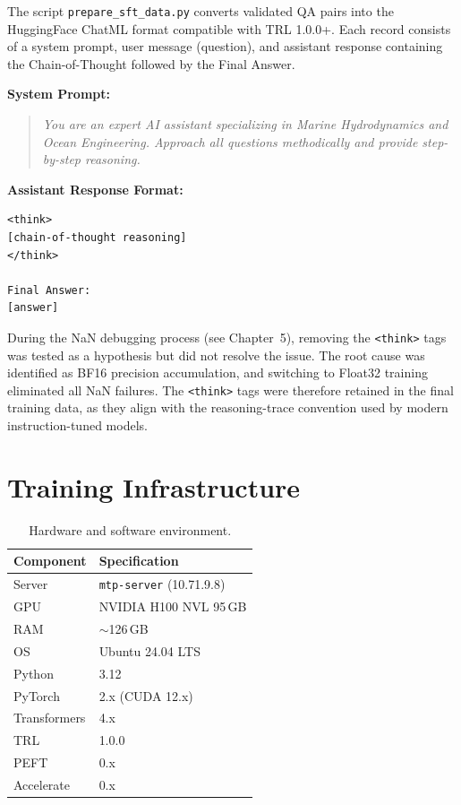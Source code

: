 \documentclass[12pt]{report}
\begin{document}
The script \texttt{prepare\_sft\_data.py} converts validated QA pairs into the HuggingFace ChatML format compatible with TRL 1.0.0+. Each record consists of a system prompt, user message (question), and assistant response containing the Chain-of-Thought followed by the Final Answer.

\textbf{System Prompt:}
\begin{quote}
\textit{You are an expert AI assistant specializing in Marine Hydrodynamics and Ocean Engineering. Approach all questions methodically and provide step-by-step reasoning.}
\end{quote}

\textbf{Assistant Response Format:}
\begin{verbatim}
<think>
[chain-of-thought reasoning]
</think>

Final Answer:
[answer]
\end{verbatim}

During the NaN debugging process (see Chapter~5), removing the \texttt{<think>} tags was tested as a hypothesis but did not resolve the issue. The root cause was identified as BF16 precision accumulation, and switching to Float32 training eliminated all NaN failures. The \texttt{<think>} tags were therefore retained in the final training data, as they align with the reasoning-trace convention used by modern instruction-tuned models.

\section{Training Infrastructure}

\begin{table}[H]
\centering
\caption{Hardware and software environment.}
\label{tab:infra}
\begin{tabular}{ll}
\toprule
\textbf{Component} & \textbf{Specification} \\
\midrule
Server & \texttt{mtp-server} (10.71.9.8) \\
GPU & NVIDIA H100 NVL 95\,GB \\
RAM & $\sim$126\,GB \\
OS & Ubuntu 24.04 LTS \\
Python & 3.12 \\
PyTorch & 2.x (CUDA 12.x) \\
Transformers & 4.x \\
TRL & 1.0.0 \\
PEFT & 0.x \\
Accelerate & 0.x \\
\bottomrule
\end{tabular}
\end{table}
\end{document}
